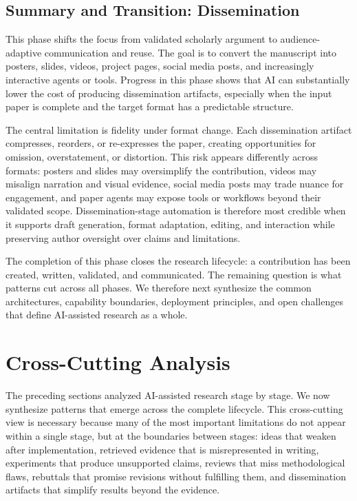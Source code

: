 \documentclass{llmxive}
\begin{document}
\subsection{Summary and Transition: Dissemination}
\label{sec:dissemination_summary}

This phase shifts the focus from validated scholarly argument to audience-adaptive communication and reuse. The goal is to convert the manuscript into posters, slides, videos, project pages, social media posts, and increasingly interactive agents or tools. Progress in this phase shows that AI can substantially lower the cost of producing dissemination artifacts, especially when the input paper is complete and the target format has a predictable structure.

The central limitation is fidelity under format change. Each dissemination artifact compresses, reorders, or re-expresses the paper, creating opportunities for omission, overstatement, or distortion. This risk appears differently across formats: posters and slides may oversimplify the contribution, videos may misalign narration and visual evidence, social media posts may trade nuance for engagement, and paper agents may expose tools or workflows beyond their validated scope. Dissemination-stage automation is therefore most credible when it supports draft generation, format adaptation, editing, and interaction while preserving author oversight over claims and limitations.

The completion of this phase closes the research lifecycle: a contribution has been created, written, validated, and communicated. The remaining question is what patterns cut across all phases. We therefore next synthesize the common architectures, capability boundaries, deployment principles, and open challenges that define AI-assisted research as a whole.
\section{Cross-Cutting Analysis}
\label{sec:cross_cutting}

The preceding sections analyzed AI-assisted research stage by stage. We now synthesize patterns that emerge across the complete lifecycle. This cross-cutting view is necessary because many of the most important limitations do not appear within a single stage, but at the boundaries between stages: ideas that weaken after implementation, retrieved evidence that is misrepresented in writing, experiments that produce unsupported claims, reviews that miss methodological flaws, rebuttals that promise revisions without fulfilling them, and dissemination artifacts that simplify results beyond the evidence.
\end{document}
